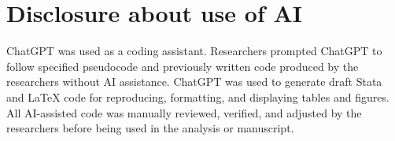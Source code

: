 \documentclass[10pt,twoside,reqno]{article}
\begin{document}
\section{Disclosure about use of AI}

ChatGPT was used as a coding assistant. Researchers prompted ChatGPT to follow specified pseudocode and previously written code produced by the researchers without AI assistance. ChatGPT was used to generate draft Stata and LaTeX code for reproducing, formatting, and displaying tables and figures. All AI-assisted code was manually reviewed, verified, and adjusted by the researchers before being used in the analysis or manuscript.








\end{document}
